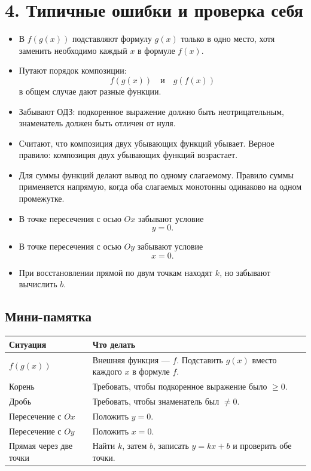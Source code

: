 \documentclass[a4paper,12pt]{article}
\newcommand{\sect}[1]{\section*{\textcolor{darkaccent}{#1}}}
\newcommand{\subsect}[1]{\subsection*{\textcolor{accent}{#1}}}
\begin{document}
\clearpage

\sect{4. Типичные ошибки и проверка себя}

\begin{itemize}

  \item В $f(g(x))$ подставляют формулу $g(x)$ только в одно место,
  хотя заменить необходимо каждый $x$ в формуле $f(x)$.

  \item Путают порядок композиции:
  \[
  f(g(x))
  \quad\text{и}\quad
  g(f(x))
  \]
  в общем случае дают разные функции.

  \item Забывают ОДЗ:
  подкоренное выражение должно быть неотрицательным,
  знаменатель должен быть отличен от нуля.

  \item Считают, что композиция двух убывающих функций убывает.
  Верное правило:
  композиция двух убывающих функций возрастает.

  \item Для суммы функций делают вывод по одному слагаемому.
  Правило суммы применяется напрямую, когда оба слагаемых
  монотонны одинаково на одном промежутке.

  \item В точке пересечения с осью $Ox$ забывают условие
  \[
  y=0.
  \]

  \item В точке пересечения с осью $Oy$ забывают условие
  \[
  x=0.
  \]

  \item При восстановлении прямой по двум точкам находят $k$,
  но забывают вычислить $b$.

\end{itemize}

\subsect{Мини-памятка}

\begin{center}
\begin{tabularx}{\linewidth}{@{}lX@{}}
\toprule
Ситуация & Что делать \\
\midrule

$f(g(x))$
&
Внешняя функция --- $f$.
Подставить $g(x)$ вместо каждого $x$ в формуле $f$.
\\

Корень
&
Требовать, чтобы подкоренное выражение было $\ge0$.
\\

Дробь
&
Требовать, чтобы знаменатель был $\ne0$.
\\

Пересечение с $Ox$
&
Положить $y=0$.
\\

Пересечение с $Oy$
&
Положить $x=0$.
\\

Прямая через две точки
&
Найти $k$, затем $b$, записать $y=kx+b$ и проверить обе точки.
\\

\bottomrule
\end{tabularx}
\end{center}
\end{document}
